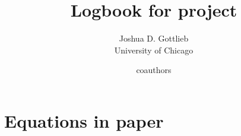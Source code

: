 \documentclass{report}
\title{Logbook for project}
\author{
    Joshua D. Gottlieb \\ {University of Chicago} \and
    coauthors
}
\date{}
\numberwithin{equation}{section}
\numberwithin{figure}{section}
\numberwithin{table}{section}
\begin{document}
\clearpage
\section{Equations in paper}
\nocite{Arrow:1963}

\end{document}
